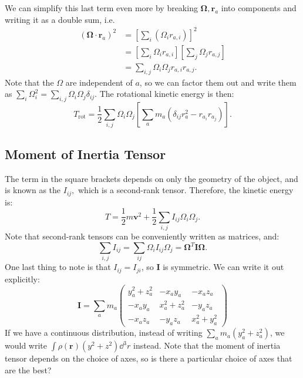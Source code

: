 \documentclass{article}
\numberwithin{equation}{section}
\begin{document}
We can simplify this last term even more by breaking $\bm{\Omega},\bm{r}_a$ into components and writing it as a double sum, i.e.
\begin{align}
    (\bm{\Omega}\cdot\bm{r}_a)^2 &= \left[\sum_i (\Omega_ir_{a,i})\right]^2 \\
    &= \left[\sum_i \Omega_i r_{a,i}\right]\left[\sum_j \Omega_j r_{a,j}\right] \\ 
    &= \sum_{i,j} \Omega_i\Omega_j r_{a,i}r_{a,j}.
\end{align}
Note that the $\Omega$ are independent of $a$, so we can factor them out and write them as $\sum_i \Omega_i^2 = \sum_{i,j}\Omega_i\Omega_j \delta_{ij}$. The rotational kinetic energy is then:
\begin{equation}
    T_\text{rot} = \frac{1}{2}\sum_{i,j} \Omega_i\Omega_j\left[\sum_a m_a\left(\delta_{ij}r_a^2 - r_{a_i}r_{a_j}\right)\right].
\end{equation}
\subsection{Moment of Inertia Tensor}
The term in the square brackets depends on only the geometry of the object, and is known as the  $I_{ij},$ which is a second-rank tensor. Therefore, the kinetic energy is:
\begin{equation}
    T = \frac{1}{2}m\bm{v}^2 + \frac{1}{2}\sum_{i,j} I_{ij}\Omega_i\Omega_j.
\end{equation}
Note that second-rank tensors can be conveniently written as matrices, and:
\begin{equation}
    \sum_{i,j} I_{ij} = \sum_{ij} \Omega_i I_{ij} \Omega_j = \bm{\Omega}^T \bm{I} \bm{\Omega}.
\end{equation}
One last thing to note is that $I_{ij}=I_{ji}$, so $\bm{I}$ is symmetric. We can write it out explicitly:
\begin{equation}
    \bm{I} = \sum_a m_a\begin{pmatrix}
        y_a^2+z_a^2 & -x_ay_a & -x_az_a \\ 
        -x_ay_a & x_a^2+z_a^2 & -y_az_a \\
        -x_az_a & -y_az_a & x_a^2+y_a^2
    \end{pmatrix}
\end{equation}
If we have a continuous distribution, instead of writing $\sum_a m_a(y_a^2+z_a^2)$, we would write $\int \rho(\bm{r})(y^2+z^2)\dd^3{r}$ instead. Note that the moment of inertia tensor depends on the choice of axes, so is there a particular choice of axes that are the best?
\end{document}
